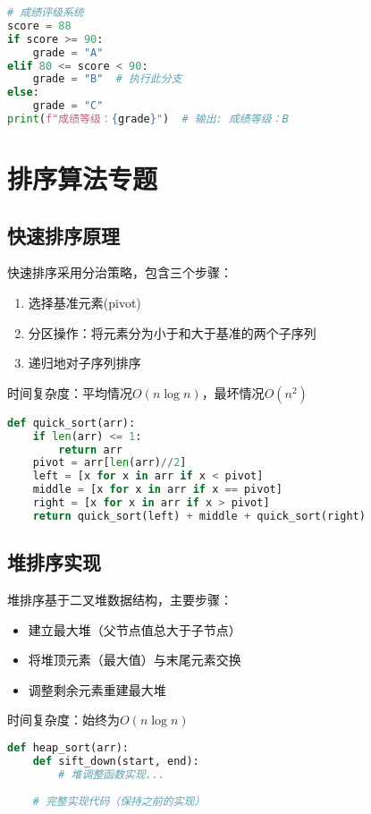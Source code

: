 \documentclass{ctexart}
\begin{document}
\begin{lstlisting}[language=Python]
# 成绩评级系统
score = 88
if score >= 90:
    grade = "A"
elif 80 <= score < 90:
    grade = "B"  # 执行此分支
else:
    grade = "C"
print(f"成绩等级：{grade}")  # 输出: 成绩等级：B
\end{lstlisting}

\section{排序算法专题}
\subsection{快速排序原理}
快速排序采用分治策略，包含三个步骤：
\begin{enumerate}
\item 选择基准元素(pivot)
\item 分区操作：将元素分为小于和大于基准的两个子序列
\item 递归地对子序列排序
\end{enumerate}
时间复杂度：平均情况$O(n \log n)$，最坏情况$O(n^2)$

\begin{lstlisting}[language=Python]
def quick_sort(arr):
    if len(arr) <= 1:
        return arr
    pivot = arr[len(arr)//2]
    left = [x for x in arr if x < pivot]
    middle = [x for x in arr if x == pivot]
    right = [x for x in arr if x > pivot]
    return quick_sort(left) + middle + quick_sort(right)
\end{lstlisting}

\subsection{堆排序实现}
堆排序基于二叉堆数据结构，主要步骤：
\begin{itemize}
\item 建立最大堆（父节点值总大于子节点）
\item 将堆顶元素（最大值）与末尾元素交换
\item 调整剩余元素重建最大堆
\end{itemize}
时间复杂度：始终为$O(n \log n)$

\begin{lstlisting}[language=Python]
def heap_sort(arr):
    def sift_down(start, end):
        # 堆调整函数实现...
    
    # 完整实现代码（保持之前的实现）
\end{lstlisting}
\end{document}
